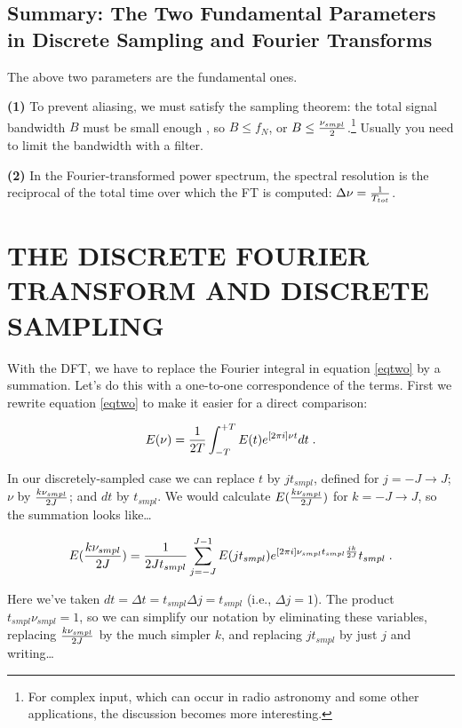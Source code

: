 \documentclass[psfig,preprint]{aastex}
\begin{document}
\subsection {Summary: The Two Fundamental Parameters in Discrete
Sampling and Fourier Transforms}

	The above two parameters are the fundamental ones.  

	{\bf (1)} To prevent aliasing, we must satisfy the sampling
theorem: the total signal bandwidth $B$ must be small enough , so $B
\leq f_N$, or $B \leq {\nu_{smpl} \over 2}$.\footnote{For complex input,
which can occur in radio astronomy and some other applications, the
discussion becomes more interesting.} Usually you need to limit the
bandwidth with a filter.

	{\bf (2)} In the Fourier-transformed power spectrum, the spectral
resolution is the reciprocal of the total time over which the FT is
computed: $\Delta \nu ={1 \over T_{tot}}$. 

\section{THE DISCRETE FOURIER TRANSFORM AND DISCRETE SAMPLING}

\label{four}

	With the DFT, we have to replace the Fourier integral in
equation \ref{eqtwo} by a summation.  Let's do this with a one-to-one
correspondence of the terms. First we rewrite equation \ref{eqtwo} to
make it easier for a direct comparison:

\begin{equation} \label{eqtwoa}
E(\nu) = {1 \over 2T}
\int_{-T}^{+T} E(t) e^{[2 \pi i]\nu t}  dt \; .
\end{equation}

	In our discretely-sampled case we can replace $t$ by $j
t_{smpl}$, defined for $j = -J \rightarrow J$; $\nu$ by ${k\nu_{smpl}
\over 2J}$; and $dt$ by $t_{smpl}$.  We would calculate
$E({k\nu_{smpl}\over 2J})$ for $k = -J \rightarrow J$, so the summation
looks like\dots

\begin{equation} \label{eqfivea}
E({k\nu_{smpl} \over 2J}) = {1 \over 2Jt_{smpl}} \sum_{j=-J}^{J-1}  E(j
t_{smpl}) e^{[2 \pi i] \nu_{smpl}t_{smpl} {jk \over 2J}} t_{smpl} \; .
\end{equation}

\noindent Here we've taken $dt = \Delta t = t_{smpl} \Delta j =
t_{smpl}$ (i.e., $\Delta j=1$).  The product $t_{smpl}\nu_{smpl} = 1$,
so we can simplify our notation by eliminating these variables,
replacing ${k\nu_{smpl} \over 2J}$ by the much simpler $k$, and
replacing $j t_{smpl}$ by just $j$ and writing\dots
\end{document}
